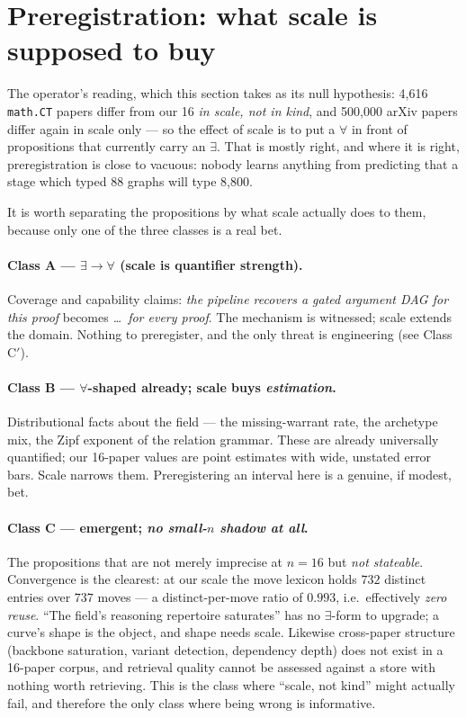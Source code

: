 \section{Preregistration: what scale is supposed to buy}
\label{sec:prereg}

The operator's reading, which this section takes as its null hypothesis: 4{,}616
\texttt{math.CT} papers differ from our 16 \emph{in scale, not in kind}, and
500{,}000 arXiv papers differ again in scale only --- so the effect of scale is
to put a $\forall$ in front of propositions that currently carry an $\exists$.
That is mostly right, and where it is right, preregistration is close to
vacuous: nobody learns anything from predicting that a stage which typed 88
graphs will type 8{,}800.

It is worth separating the propositions by what scale actually does to them,
because only one of the three classes is a real bet.

\paragraph{Class A --- $\exists \to \forall$ (scale is quantifier strength).}
Coverage and capability claims: \emph{the pipeline recovers a gated argument DAG
for this proof} becomes \emph{\dots\ for every proof}. The mechanism is
witnessed; scale extends the domain. Nothing to preregister, and the only
threat is engineering (see Class C$'$).

\paragraph{Class B --- $\forall$-shaped already; scale buys \emph{estimation}.}
Distributional facts about the field --- the missing-warrant rate, the archetype
mix, the Zipf exponent of the relation grammar. These are already universally
quantified; our 16-paper values are point estimates with wide, unstated error
bars. Scale narrows them. Preregistering an interval here is a genuine, if
modest, bet.

\paragraph{Class C --- emergent; \emph{no small-$n$ shadow at all}.}
The propositions that are not merely imprecise at $n{=}16$ but \emph{not
stateable}. Convergence is the clearest: at our scale the move lexicon holds
$732$ distinct entries over $737$ moves --- a distinct-per-move ratio of
$0.993$, i.e.\ effectively \emph{zero reuse}. ``The field's reasoning repertoire
saturates'' has no $\exists$-form to upgrade; a curve's shape is the object, and
shape needs scale. Likewise cross-paper structure (backbone saturation, variant
detection, dependency depth) does not exist in a 16-paper corpus, and retrieval
quality cannot be assessed against a store with nothing worth retrieving. This
is the class where ``scale, not kind'' might actually fail, and therefore the
only class where being wrong is informative.

